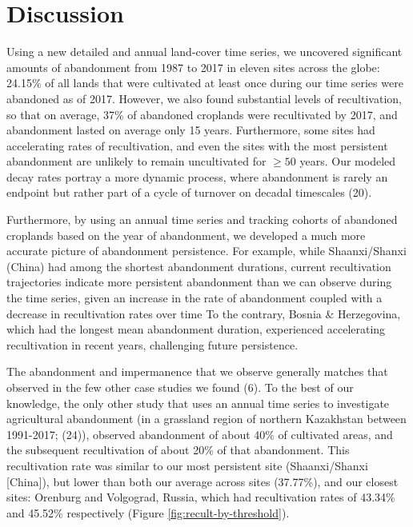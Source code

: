 \documentclass[9pt,twocolumn,twoside,]{pnas-new}
\begin{document}
\hypertarget{discussion}{%
\section{Discussion}\label{discussion}}

Using a new detailed and annual land-cover time series, we uncovered
significant amounts of abandonment from 1987 to 2017 in eleven sites
across the globe: 24.15\% of all lands that were cultivated at least
once during our time series were abandoned as of 2017. However, we also
found substantial levels of recultivation, so that on average, 37\% of
abandoned croplands were recultivated by 2017, and abandonment lasted on
average only 15 years. Furthermore, some sites had accelerating rates of
recultivation, and even the sites with the most persistent abandonment
are unlikely to remain uncultivated for \(\geq50\) years. Our modeled
decay rates portray a more dynamic process, where abandonment is rarely
an endpoint but rather part of a cycle of turnover on decadal timescales
(20).

Furthermore, by using an annual time series and tracking cohorts of
abandoned croplands based on the year of abandonment, we developed a
much more accurate picture of abandonment persistence. For example,
while Shaanxi/Shanxi (China) had among the shortest abandonment
durations, current recultivation trajectories indicate more persistent
abandonment than we can observe during the time series, given an
increase in the rate of abandonment coupled with a decrease in
recultivation rates over time To the contrary, Bosnia \& Herzegovina,
which had the longest mean abandonment duration, experienced
accelerating recultivation in recent years, challenging future
persistence.

The abandonment and impermanence that we observe generally matches that
observed in the few other case studies we found (6). To the best of our
knowledge, the only other study that uses an annual time series to
investigate agricultural abandonment (in a grassland region of northern
Kazakhstan between 1991-2017; (24)), observed abandonment of about 40\%
of cultivated areas, and the subsequent recultivation of about 20\% of
that abandonment. This recultivation rate was similar to our most
persistent site (Shaanxi/Shanxi {[}China{]}), but lower than both our
average across sites (37.77\%), and our closest sites: Orenburg and
Volgograd, Russia, which had recultivation rates of 43.34\% and 45.52\%
respectively (Figure \ref{fig:recult-by-threshold}).
\end{document}
